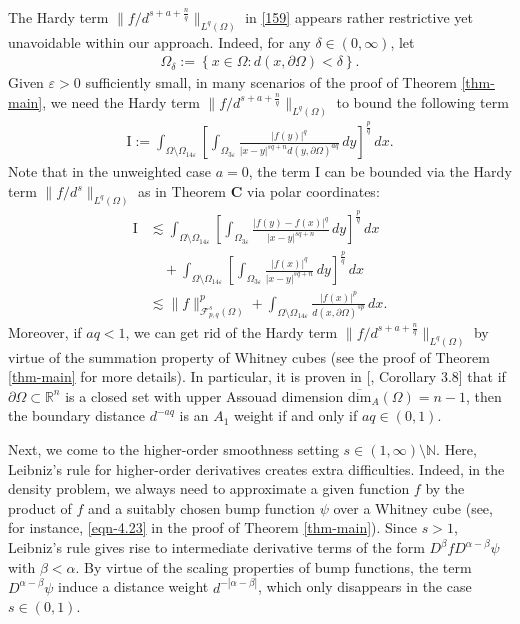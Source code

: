 \documentclass[11pt,twoside]{article}
\def\rn{{\mathbb{R}^n}}
\def\nn{{\mathbb N}}
\def\dz{\delta}
\def\boz{{\Omega}}
\def\pa{\partial}                %
\theoremstyle{mylem}
\theoremstyle{definition}
\numberwithin{equation}{section}
\begin{document}
The Hardy term $\|{f}/{d^{s+a+\frac{n}{q}}}\|_{L^q(\Omega)}$
in \eqref{159} appears rather restrictive yet unavoidable within our approach. 
Indeed, for any $\delta\in (0,\infty)$, let
\begin{align}\label{eqn-OBD}
\boz_\delta:=\left\{x\in\boz: d(x,\partial \boz)<\dz\right\}.
\end{align}
Given $\varepsilon >0$ sufficiently small, in many scenarios of the proof of Theorem \ref{thm-main}, 
we need the Hardy term $\|{f}/{d^{s+a+\frac{n}{q}}}\|_{L^q(\Omega)}$ to bound the following term
\begin{align*}
\mathrm{I}:=\int_{\Omega \setminus \Omega_{14\varepsilon}} \left[  \int_{\Omega_{3\varepsilon}} 
\frac{| f(y)|^q}{|x - y|^{s q + n}d(y,\pa\boz)^{aq}}\,dy \right]^{\frac{p}{q}}\,dx.
\end{align*}
Note that in the unweighted case $a=0$, the term $\mathrm{I}$ can be bounded via the Hardy term $\|{f}/{d^{s}}\|_{L^q(\Omega)}$ as in Theorem {\bf C} via polar coordinates:
\begin{align*}
\mathrm{I}&\lesssim \int_{\Omega \setminus \Omega_{14\varepsilon}} \left[ \int_{\Omega_{3\varepsilon}} 
\frac{| f(y)-f(x)|^q}{|x - y|^{s q + n} }\,dy \right]^{\frac{p}{q}}\,dx\\
&\quad+\int_{\Omega \setminus \Omega_{14\varepsilon}} \left[  \int_{\Omega_{3\varepsilon}} 
\frac{| f(x)|^q}{|x - y|^{s q + n} }\,dy \right]^{\frac{p}{q}}\,dx \\
&\lesssim \|f\|_{\mathcal{F}_{p,q}^s(\boz)}^p+\int_{\Omega \setminus \Omega_{14\varepsilon}} 
\frac{|f(x)|^p}{d(x,\partial \boz)^{sp}}\,dx.
\end{align*}
Moreover, if $aq<1$, we can get rid of the Hardy term $\|{f}/{d^{s+a+\frac{n}{q}}}\|_{L^q(\Omega)}$
by virtue of the summation property of Whitney cubes (see the proof of Theorem \ref{thm-main} for more details). 
In particular, it is proven in [\cite{dilt2019}, Corollary 3.8] that if  $\partial\Omega\subset\rn$ is a closed set with 
upper Assouad dimension 
$\overline{\mathrm{dim}}_A(\Omega)=n-1$,  then 
the boundary  distance $d^{-aq}$ is an $A_1$ weight if and only if $aq\in(0,1)$.

Next, we come to the higher-order smoothness setting $s\in (1,\infty)\setminus\nn$. 
Here, Leibniz's rule for higher-order derivatives creates extra 
difficulties. Indeed, in the density problem, we always need to approximate 
a given function $f$ by the product of $f$ and a suitably chosen bump function $\psi$ over a Whitney cube
(see, for instance, \eqref{eqn-4.23} in the proof of 
Theorem \ref{thm-main}). Since $s>1$, Leibniz's rule 
gives rise to intermediate derivative terms of the form $D^\beta fD^{\alpha-\beta}\psi$ with $\beta<\alpha$. 
By virtue of the scaling properties of bump functions, the  term
$D^{\alpha-\beta}\psi$ induce a distance weight $d^{-|\alpha-\beta|}$,
which only disappears in the case $s\in (0,1)$.
\end{document}
